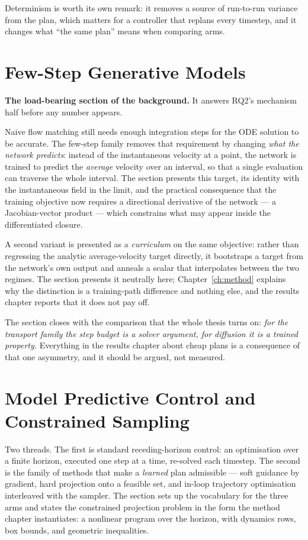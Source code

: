 \documentclass[headsepline,footsepline,footinclude=false,oneside,fontsize=11pt,paper=a4,listof=totoc,bibliography=totoc]{scrbook}
\begin{document}
Determinism is worth its own remark: it removes a source of run-to-run variance from the
plan, which matters for a controller that replans every timestep, and it changes what
``the same plan'' means when comparing arms.

\section{Few-Step Generative Models}\label{sec:bg:fewstep}

\textbf{The load-bearing section of the background.} It answers RQ2's mechanism half before
any number appears.

Naive flow matching still needs enough integration steps for the ODE solution to be
accurate. The few-step family removes that requirement by changing \emph{what the network
predicts}: instead of the instantaneous velocity at a point, the network is trained to
predict the \emph{average} velocity over an interval, so that a single evaluation can
traverse the whole interval. The section presents this target, its identity with the
instantaneous field in the limit, and the practical consequence that the training objective
now requires a directional derivative of the network --- a Jacobian-vector product ---
which constrains what may appear inside the differentiated closure.

A second variant is presented as a \emph{curriculum} on the same objective: rather than
regressing the analytic average-velocity target directly, it bootstraps a target from the
network's own output and anneals a scalar that interpolates between the two regimes. The
section presents it neutrally here; Chapter~\ref{ch:method} explains why the distinction is
a training-path difference and nothing else, and the results chapter reports that it does
not pay off.

The section closes with the comparison that the whole thesis turns on: \emph{for the
transport family the step budget is a solver argument, for diffusion it is a trained
property.} Everything in the results chapter about cheap plans is a consequence of that one
asymmetry, and it should be argued, not measured.

\section{Model Predictive Control and Constrained Sampling}\label{sec:bg:mpc}

Two threads. The first is standard receding-horizon control: an optimisation over a finite
horizon, executed one step at a time, re-solved each timestep. The second is the family of
methods that make a \emph{learned} plan admissible --- soft guidance by gradient, hard
projection onto a feasible set, and in-loop trajectory optimisation interleaved with the
sampler. The section sets up the vocabulary for the three arms and states the constrained
projection problem in the form the method chapter instantiates: a nonlinear program over the
horizon, with dynamics rows, box bounds, and geometric inequalities.
\end{document}
